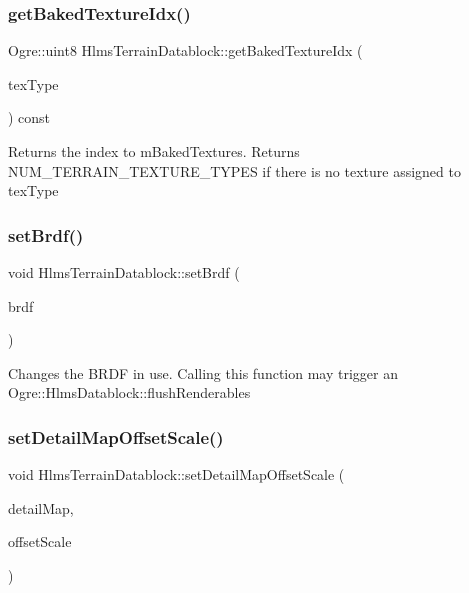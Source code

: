 \subsubsection{\texorpdfstring{get\+Baked\+Texture\+Idx()}{getBakedTextureIdx()}}
{\footnotesize\ttfamily Ogre\+::uint8 Hlms\+Terrain\+Datablock\+::get\+Baked\+Texture\+Idx (\begin{DoxyParamCaption}\item[{Terrain\+Texture\+Types}]{tex\+Type }\end{DoxyParamCaption}) const}

Returns the index to m\+Baked\+Textures. Returns N\+U\+M\+\_\+\+T\+E\+R\+R\+A\+I\+N\+\_\+\+T\+E\+X\+T\+U\+R\+E\+\_\+\+T\+Y\+P\+ES if there is no texture assigned to tex\+Type \mbox{\label{class_hlms_terrain_datablock_ab4d3d4b79e5fa6340579ad40f8be945f}} 
\subsubsection{\texorpdfstring{set\+Brdf()}{setBrdf()}}
{\footnotesize\ttfamily void Hlms\+Terrain\+Datablock\+::set\+Brdf (\begin{DoxyParamCaption}\item[{Terrain\+Brdf\+::\+Terrain\+Brdf}]{brdf }\end{DoxyParamCaption})}

Changes the B\+R\+DF in use. Calling this function may trigger an Ogre\+::\+Hlms\+Datablock\+::flush\+Renderables \mbox{\label{class_hlms_terrain_datablock_af4b0ac3a3030192a4bb2200567dcc1fd}} 
\subsubsection{\texorpdfstring{set\+Detail\+Map\+Offset\+Scale()}{setDetailMapOffsetScale()}}
{\footnotesize\ttfamily void Hlms\+Terrain\+Datablock\+::set\+Detail\+Map\+Offset\+Scale (\begin{DoxyParamCaption}\item[{Ogre\+::uint8}]{detail\+Map,  }\item[{const Ogre\+::\+Vector4 \&}]{offset\+Scale }\end{DoxyParamCaption})}

